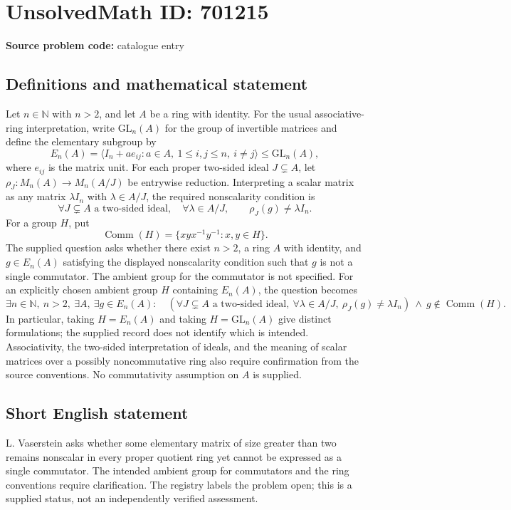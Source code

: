 \documentclass[11pt]{article}
\newcommand{\N}{\mathbb{N}}
\begin{document}
\section*{UnsolvedMath ID: 701215}
\textbf{Source problem code:} catalogue entry
\subsection{Definitions and mathematical statement}
Let \(n\in\N\) with \(n>2\), and let \(A\) be a ring with identity. For the usual associative-ring interpretation, write \(\mathrm{GL}_n(A)\) for the group of invertible matrices and define the elementary subgroup by
\[
E_n(A)=\bigl\langle I_n+a e_{ij}:a\in A,\ 1\leq i,j\leq n,\ i\neq j\bigr\rangle\leq\mathrm{GL}_n(A),
\]
where \(e_{ij}\) is the matrix unit. For each proper two-sided ideal \(J\subsetneq A\), let \(\rho_J:M_n(A)\to M_n(A/J)\) be entrywise reduction. Interpreting a scalar matrix as any matrix \(\lambda I_n\) with \(\lambda\in A/J\), the required nonscalarity condition is
\[
\forall J\subsetneq A\text{ a two-sided ideal},\quad
\forall\lambda\in A/J,\qquad \rho_J(g)\neq\lambda I_n.
\]
For a group \(H\), put
\[
\operatorname{Comm}(H)=\{xyx^{-1}y^{-1}:x,y\in H\}.
\]
The supplied question asks whether there exist \(n>2\), a ring \(A\) with identity, and \(g\in E_n(A)\) satisfying the displayed nonscalarity condition such that \(g\) is not a single commutator. The ambient group for the commutator is not specified. For an explicitly chosen ambient group \(H\) containing \(E_n(A)\), the question becomes
\[
\exists n\in\N,\ n>2,\ \exists A,\ \exists g\in E_n(A):\quad
\left(\forall J\subsetneq A\text{ a two-sided ideal},\ \forall\lambda\in A/J,\ \rho_J(g)\neq\lambda I_n\right)
\ \land\ g\notin\operatorname{Comm}(H).
\]
In particular, taking \(H=E_n(A)\) and taking \(H=\mathrm{GL}_n(A)\) give distinct formulations; the supplied record does not identify which is intended. Associativity, the two-sided interpretation of ideals, and the meaning of scalar matrices over a possibly noncommutative ring also require confirmation from the source conventions. No commutativity assumption on \(A\) is supplied.
\subsection{Short English statement}
L. Vaserstein asks whether some elementary matrix of size greater than two remains nonscalar in every proper quotient ring yet cannot be expressed as a single commutator. The intended ambient group for commutators and the ring conventions require clarification. The registry labels the problem open; this is a supplied status, not an independently verified assessment.
\end{document}
